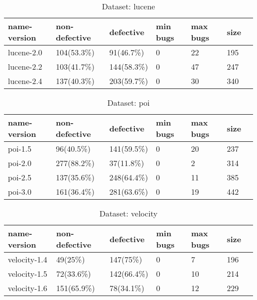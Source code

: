 \documentclass[]{article}
\begin{document}
	\begin{table}[h]
		\caption{Dataset: lucene}\label{tab:lucene}
		\begin{tabular}{lllllll}
			\hline
			name-version & non-defective & defective & min bugs & max bugs & size \\ \hline
			lucene-2.0 & 104(53.3\%) & 91(46.7\%) & 0 & 22 & 195 \\ 
			lucene-2.2 & 103(41.7\%) & 144(58.3\%) & 0 & 47 & 247 \\ 
			lucene-2.4 & 137(40.3\%) & 203(59.7\%) & 0 & 30 & 340 \\ \hline
		\end{tabular}
	\end{table}
	\begin{table}[h]
		\caption{Dataset: poi}\label{tab:poi}
		\begin{tabular}{lllllll}
			\hline
			name-version & non-defective & defective & min bugs & max bugs & size \\ \hline
			poi-1.5 & 96(40.5\%) & 141(59.5\%) & 0 & 20 & 237 \\ 
			poi-2.0 & 277(88.2\%) & 37(11.8\%) & 0 & 2 & 314 \\ 
			poi-2.5 & 137(35.6\%) & 248(64.4\%) & 0 & 11 & 385 \\ 
			poi-3.0 & 161(36.4\%) & 281(63.6\%) & 0 & 19 & 442 \\ \hline
		\end{tabular}
	\end{table}
	
	\begin{table}[h]
		\caption{Dataset: velocity}\label{tab:velocity}
		\begin{tabular}{lllllll}
			\hline
			name-version & non-defective & defective & min bugs & max bugs & size \\ \hline
			velocity-1.4 & 49(25\%) & 147(75\%) & 0 & 7 & 196 \\ 
			velocity-1.5 & 72(33.6\%) & 142(66.4\%) & 0 & 10 & 214 \\ 
			velocity-1.6 & 151(65.9\%) & 78(34.1\%) & 0 & 12 & 229 \\ \hline
		\end{tabular}
	\end{table}
	
\end{document}

